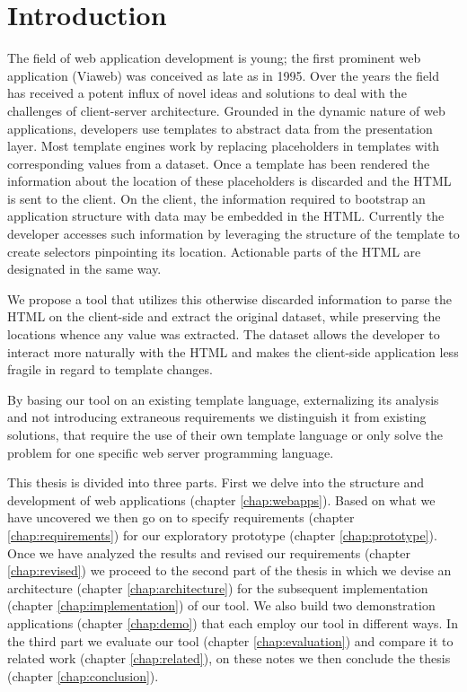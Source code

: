 \documentclass[thesis.tex]{subfiles}
\begin{document}
\chapter{Introduction}
\label{chap:intro}
The field of web application development is young; the first prominent
web application (Viaweb) was conceived as late as in 1995.
Over the years the field has received a potent influx of novel ideas and
solutions to deal with the challenges of client-server architecture.
Grounded in the dynamic nature of web applications, developers use templates to
abstract data from the presentation layer.
Most template engines work by replacing placeholders in templates with
corresponding values from a dataset.
Once a template has been rendered the information about the location of these
placeholders is discarded and the HTML is sent to the client.
On the client, the information required to bootstrap an application structure
with data may be embedded in the HTML. Currently the developer accesses such
information by leveraging the structure of the template to create selectors
pinpointing its location. Actionable parts of the HTML are designated in the
same way.

We propose a tool that utilizes this otherwise discarded information to parse
the HTML on the client-side and extract the original dataset, while preserving
the locations whence any value was extracted. The dataset allows the developer
to interact more naturally with the HTML and makes the client-side application
less fragile in regard to template changes.

By basing our tool on an existing template language, externalizing its
analysis and not introducing extraneous requirements we distinguish it from
existing solutions,
that require the use of their own template language or only solve the problem
for one specific web server programming language.


This thesis is divided into three parts. First we delve into the structure
and development of web applications (chapter \ref{chap:webapps}).
Based on what we have uncovered we then go on to specify
requirements (chapter \ref{chap:requirements}) for our
exploratory prototype (chapter \ref{chap:prototype}).
Once we have analyzed the results and revised our
requirements (chapter \ref{chap:revised}) we proceed to the second part of the
thesis in which we devise an architecture (chapter \ref{chap:architecture}) for
the subsequent implementation (chapter \ref{chap:implementation}) of our tool.
We also build two demonstration applications (chapter \ref{chap:demo}) that each
employ our tool in different ways.
In the third part we evaluate our tool (chapter \ref{chap:evaluation}) and
compare it to related work (chapter \ref{chap:related}), on these notes we then
conclude the thesis (chapter \ref{chap:conclusion}).
\end{document}
